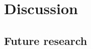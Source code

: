\documentclass[Bachelorarbeit.tex]{subfiles}
\begin{document}
\newpage


\section{Discussion}
 \label{sec:discussion}
\subsection*{Future research}
\end{document}
